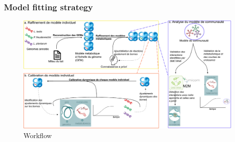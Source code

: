 \documentclass[8pt]{beamer}
\begin{document}
\begin{frame}
\frametitle{Model fitting strategy}
\begin{adjustwidth}{-1cm}{}
\begin{figure}
\includegraphics[width=1.2\textwidth]{figures/global.pdf}
\vspace{-0.7cm}\caption{Workflow}
\end{figure}
\end{adjustwidth}
\end{frame}

\tiny
\printbibliography
\end{document}
